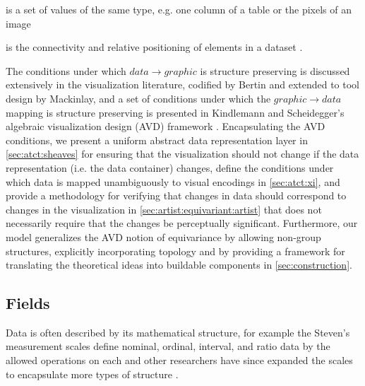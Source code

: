 \documentclass[journal]{IEEEtran}
\theoremstyle{definition}
\theoremstyle{remark}
\begin{document}
\begin{LaTeXdescription}
  \item[\textcolor{fiber}{\textbf{field}} \footnote{Throughout this paper, we use color in definitions, equations, and visualizations to group conceptually related terms\cite{headMathAugmentationHow2022}, for example \textcolor{fiber}{field} and \textcolor{fiber}{fiber}.}] is a set of values of the same type, e.g. one column of a table or the pixels of an image
  \item[\textcolor{base}{\textbf{topology}}] is the connectivity and relative positioning of elements in a dataset \cite{wilkinsonGrammarGraphics2005}.
\end{LaTeXdescription}

The conditions under which $data \rightarrow graphic$ is structure preserving is discussed extensively in the visualization literature, codified by Bertin\cite{bertinSemiologyGraphicsDiagrams2011} and extended to tool design by Mackinlay\cite{mackinlayAutomaticDesignGraphical1987}, and a set of conditions under which the $graphic \rightarrow data$ mapping is structure preserving is presented in Kindlemann and Scheidegger's algebraic visualization design (AVD) framework \cite{kindlmannAlgebraicProcessVisualization2014}. Encapsulating the AVD conditions, we present a uniform abstract data representation layer in \autoref{sec:atct:sheaves} for ensuring that the visualization should not change if the data representation (i.e. the data container) changes, define the conditions under which data is mapped unambiguously to visual encodings \cite{ziemkiewiczEmbeddingInformationVisualization2009} in \autoref{sec:atct:xi}, and provide a methodology for verifying that changes in data should correspond to changes in the visualization in \autoref{sec:artist:equivariant:artist} that does not necessarily require that the changes be perceptually significant. Furthermore, our model generalizes the AVD notion of equivariance by allowing non-group structures, explicitly incorporating topology and by providing a framework for translating the theoretical ideas into buildable components in \autoref{sec:construction}.

\subsection{Fields}
\label{sec:related-work:equivariance}

Data is often described by its mathematical structure, for example the Steven's measurement scales define nominal, ordinal, interval, and ratio data by the allowed operations on each \cite{stevensTheoryScalesMeasurement1946} and other researchers have since expanded the scales to encapsulate more types of structure \cite{leaFormalizationMeasurementScale1971, thomasMathematizationNotMeasurement2014}.
\end{document}
